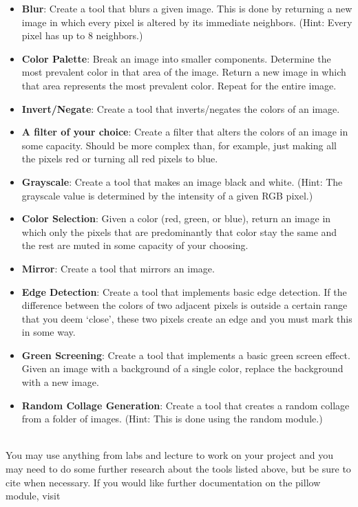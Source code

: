 \documentclass[11pt, letterpaper, onecolumn, oneside, final]{article}
\begin{document}
  \begin{itemize}
    \item \textbf{Blur}: Create a tool that blurs a given image. This is done by returning a new image in which every pixel is altered by its immediate neighbors.
    (Hint: Every pixel has up to 8 neighbors.)
    \item \textbf{Color Palette}: Break an image into smaller components. Determine the most prevalent color in that area of the image. Return a new image in which that area represents the most prevalent color. Repeat for the entire image.
    \item \textbf{Invert/Negate}: Create a tool that inverts/negates the colors of an image. 
    \item \textbf{A filter of your choice}: Create a filter that alters the colors of an image in some capacity. Should be more complex than, for example, just making all the pixels red or turning all red pixels to blue. 
    \item \textbf{Grayscale}: Create a tool that makes an image black and white. (Hint: The grayscale value is determined by the intensity of a given RGB pixel.)
    \item \textbf{Color Selection}: Given a color (red, green, or blue), return an image in which only the pixels that are predominantly that color stay the same and the rest are muted in some capacity of your choosing.
    \item \textbf{Mirror}: Create a tool that mirrors an image.
    \item \textbf{Edge Detection}: Create a tool that implements basic edge detection. If the difference between the colors of two adjacent pixels is outside a certain range that you deem `close', these two pixels create an edge and you must mark this in some way. 
    \item \textbf{Green Screening}: Create a tool that implements a basic green screen effect. Given an image with a background of a single color, replace the background with a new image.
    \item \textbf{Random Collage Generation}: Create a tool that creates a random collage from a folder of images. (Hint: This is done using the {\consolas random} module.)
  \end{itemize}
  \\
  You may use anything from labs and lecture to work on your project and you may need to do some further research about the tools listed above, but be sure to cite when necessary. If you would like further documentation on the {\consolas
  pillow} module, visit 
\end{document}
